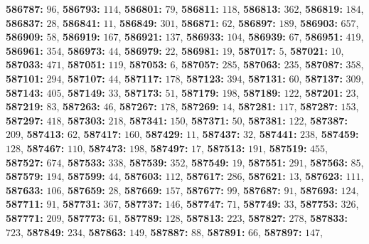 \textsf{\bfseries 586787:} $96$, \textsf{\bfseries 586793:} $114$, \textsf{\bfseries 586801:} $79$, \textsf{\bfseries 586811:} $118$, \textsf{\bfseries 586813:} $362$, \textsf{\bfseries 586819:} $184$, \textsf{\bfseries 586837:} $28$, \textsf{\bfseries 586841:} $11$, \textsf{\bfseries 586849:} $301$, \textsf{\bfseries 586871:} $62$, \textsf{\bfseries 586897:} $189$, \textsf{\bfseries 586903:} $657$, \textsf{\bfseries 586909:} $58$, \textsf{\bfseries 586919:} $167$, \textsf{\bfseries 586921:} $137$, \textsf{\bfseries 586933:} $104$, \textsf{\bfseries 586939:} $67$, \textsf{\bfseries 586951:} $419$, \textsf{\bfseries 586961:} $354$, \textsf{\bfseries 586973:} $44$, \textsf{\bfseries 586979:} $22$, \textsf{\bfseries 586981:} $19$, \textsf{\bfseries 587017:} $5$, \textsf{\bfseries 587021:} $10$, \textsf{\bfseries 587033:} $471$, \textsf{\bfseries 587051:} $119$, \textsf{\bfseries 587053:} $6$, \textsf{\bfseries 587057:} $285$, \textsf{\bfseries 587063:} $235$, \textsf{\bfseries 587087:} $358$, \textsf{\bfseries 587101:} $294$, \textsf{\bfseries 587107:} $44$, \textsf{\bfseries 587117:} $178$, \textsf{\bfseries 587123:} $394$, \textsf{\bfseries 587131:} $60$, \textsf{\bfseries 587137:} $309$, \textsf{\bfseries 587143:} $405$, \textsf{\bfseries 587149:} $33$, \textsf{\bfseries 587173:} $51$, \textsf{\bfseries 587179:} $198$, \textsf{\bfseries 587189:} $122$, \textsf{\bfseries 587201:} $23$, \textsf{\bfseries 587219:} $83$, \textsf{\bfseries 587263:} $46$, \textsf{\bfseries 587267:} $178$, \textsf{\bfseries 587269:} $14$, \textsf{\bfseries 587281:} $117$, \textsf{\bfseries 587287:} $153$, \textsf{\bfseries 587297:} $418$, \textsf{\bfseries 587303:} $218$, \textsf{\bfseries 587341:} $150$, \textsf{\bfseries 587371:} $50$, \textsf{\bfseries 587381:} $122$, \textsf{\bfseries 587387:} $209$, \textsf{\bfseries 587413:} $62$, \textsf{\bfseries 587417:} $160$, \textsf{\bfseries 587429:} $11$, \textsf{\bfseries 587437:} $32$, \textsf{\bfseries 587441:} $238$, \textsf{\bfseries 587459:} $128$, \textsf{\bfseries 587467:} $110$, \textsf{\bfseries 587473:} $198$, \textsf{\bfseries 587497:} $17$, \textsf{\bfseries 587513:} $191$, \textsf{\bfseries 587519:} $455$, \textsf{\bfseries 587527:} $674$, \textsf{\bfseries 587533:} $338$, \textsf{\bfseries 587539:} $352$, \textsf{\bfseries 587549:} $19$, \textsf{\bfseries 587551:} $291$, \textsf{\bfseries 587563:} $85$, \textsf{\bfseries 587579:} $194$, \textsf{\bfseries 587599:} $44$, \textsf{\bfseries 587603:} $112$, \textsf{\bfseries 587617:} $286$, \textsf{\bfseries 587621:} $13$, \textsf{\bfseries 587623:} $111$, \textsf{\bfseries 587633:} $106$, \textsf{\bfseries 587659:} $28$, \textsf{\bfseries 587669:} $157$, \textsf{\bfseries 587677:} $99$, \textsf{\bfseries 587687:} $91$, \textsf{\bfseries 587693:} $124$, \textsf{\bfseries 587711:} $91$, \textsf{\bfseries 587731:} $367$, \textsf{\bfseries 587737:} $146$, \textsf{\bfseries 587747:} $71$, \textsf{\bfseries 587749:} $33$, \textsf{\bfseries 587753:} $326$, \textsf{\bfseries 587771:} $209$, \textsf{\bfseries 587773:} $61$, \textsf{\bfseries 587789:} $128$, \textsf{\bfseries 587813:} $223$, \textsf{\bfseries 587827:} $278$, \textsf{\bfseries 587833:} $723$, \textsf{\bfseries 587849:} $234$, \textsf{\bfseries 587863:} $149$, \textsf{\bfseries 587887:} $88$, \textsf{\bfseries 587891:} $66$, \textsf{\bfseries 587897:} $147$, 
